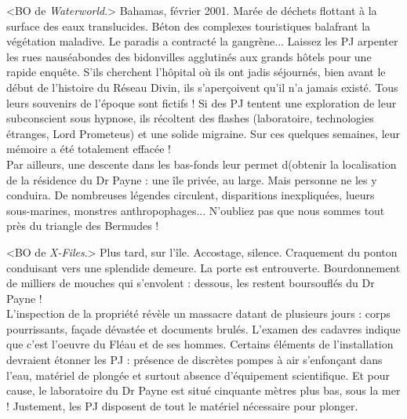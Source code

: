 \documentclass[11pt,twoside,a4paper]{book}
\begin{document}
<BO de \emph{Waterworld}.> Bahamas, f{\'e}vrier 2001. Mar{\'e}e de d{\'e}chets flottant {\`a} la surface des eaux translucides. B{\'e}ton des complexes touristiques balafrant la v{\'e}g{\'e}tation maladive. Le paradis a contract{\'e} la gangr{\`e}ne... Laissez les PJ arpenter les rues naus{\'e}abondes des bidonvilles agglutin{\'e}s aux grands h{\^o}tels pour une rapide enqu{\^e}te. S'ils cherchent l'h{\^o}pital o{\`u} ils ont jadis s{\'e}journ{\'e}s, bien avant le d{\'e}but de l'histoire du R{\'e}seau Divin, ils s'aper\c{c}oivent qu'il n'a jamais exist{\'e}. Tous leurs souvenirs de l'{\'e}poque sont fictifs ! Si des PJ tentent une exploration de leur subconscient sous hypnose, ils r{\'e}coltent des flashes (laboratoire, technologies {\'e}tranges, Lord Prometeus) et une solide migraine. Sur ces quelques semaines, leur m{\'e}moire a {\'e}t{\'e} totalement effac{\'e}e !~\\

Par ailleurs, une descente dans les bas-fonds leur permet d(obtenir la localisation de la r{\'e}sidence du Dr Payne : une {\^i}le priv{\'e}e, au large. Mais personne ne les y conduira. De nombreuses l{\'e}gendes circulent, disparitions inexpliqu{\'e}es, lueurs sous-marines, monstres anthropophages... N'oubliez pas que nous sommes tout pr{\`e}s du triangle des Bermudes ! 

<BO de \emph{X-Files}.> Plus tard, sur l'{\^i}le. Accostage, silence. Craquement du ponton conduisant vers une splendide demeure. La porte est entrouverte. Bourdonnement de milliers de mouches qui s'envolent : dessous, les restent boursoufl{\'e}s du Dr Payne !~\\

L'inspection de la propri{\'e}t{\'e} r{\'e}v{\`e}le un massacre datant de plusieurs jours : corps pourrissants, fa\c{c}ade d{\'e}vast{\'e}e et documents brul{\'e}s. L'examen des cadavres indique que c'est l'oeuvre du Fl{\'e}au et de ses hommes. Certains {\'e}l{\'e}ments de l'installation devraient {\'e}tonner les PJ : pr{\'e}sence de discr{\`e}tes pompes {\`a} air s'enfon\c{c}ant dans l'eau, mat{\'e}riel de plong{\'e}e et surtout absence d'{\'e}quipement scientifique. Et pour cause, le laboratoire du Dr Payne est situ{\'e} cinquante m{\`e}tres plus bas, sous la mer ! Justement, les PJ disposent de tout le mat{\'e}riel n{\'e}cessaire pour plonger.~\\
\end{document}
